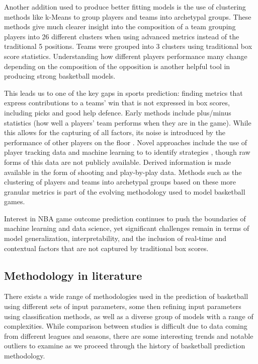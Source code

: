 \documentclass[11pt]{article}
\begin{document}
Another addition used to produce better fitting models is the use of clustering methods like k-Means to group players and teams into archetypal groups. These methods give much clearer insight into the composition of a team grouping players into 26 different clusters when using advanced metrics \cite{Osken_Onay_2022} instead of the traditional 5 positions. Teams were grouped into 3 clusters \cite{cheng_predicting_2016}  using traditional box score statistics. Understanding how different players performance many change depending on the composition of the opposition is another helpful tool in producing strong basketball models.  \medskip

This leads us to one of the key gaps in sports prediction: finding metrics that express contributions to a teams' win that is not expressed in box scores, including picks and good help defence. Early methods include plus/minus statistics (how well a players' team performs when they are in the game). While this allows for the capturing of all factors, its noise is introduced  by the performance of other players on the floor \cite{Kubatko_Oliver_Pelton_Rosenbaum_2007}. Novel approaches include the use of player tracking data and machine learning to to identify strategies \cite{tian_use_2019}, though raw forms of this data are not publicly available. Derived information is made available in the form of shooting and play-by-play data. Methods such as the clustering of players and teams into archetypal groups based on these more granular metrics is part of the evolving methodology used to model basketball games. 
\medskip

Interest in NBA game outcome prediction continues to push the boundaries of machine learning and data science, yet significant challenges remain in terms of model generalization, interpretability, and the inclusion of real-time and contextual factors that are not captured by traditional box scores.

\subsection{Methodology in literature}

There exists a wide range of methodologies used in the prediction of basketball using different sets of input parameters, some then refining input parameters using classification methods, as well as a diverse group of models with a range of complexities. While comparison between studies is difficult due to data coming from different leagues and seasons, there are some interesting trends and notable outliers to examine as we proceed through the history of basketball prediction methodology. 
\medskip
\end{document}
